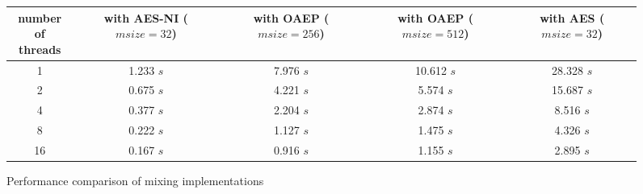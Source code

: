 \begin{figure}[t]
	\centering
	\small
	\begin{tabular}[b]{| c | c | c | c | c |}	
		\hline
		\thead{number\\of threads} &	\thead{\name\\with AES-NI\\($msize=32$)} & \thead{\name\\with OAEP\\($msize=256$)} & \thead{\name\\with OAEP\\($msize=512$)} & \thead{\name\\with AES\\($msize=32$)} 
		\\	\hline \hline
		 1 & 1.233 $s$ & 7.976 $s$ & 10.612 $s$ & 28.328 $s$
		\\ \hline
		 2 & 0.675 $s$ & 4.221 $s$ & 5.574 $s$ & 15.687 $s$
		\\ \hline
		 4 & 0.377 $s$ & 2.204 $s$ & 2.874 $s$ & 8.516 $s$
		\\ \hline
		 8 & 0.222 $s$ & 1.127 $s$ & 1.475 $s$ & 4.326 $s$
		\\ \hline
		16 & 0.167 $s$ & 0.916 $s$ & 1.155 $s$ & 2.895 $s$
		\\	\hline
	\end{tabular}
	\caption{\label{ms:table:oaep}Performance comparison of mixing implementations}
\end{figure}

